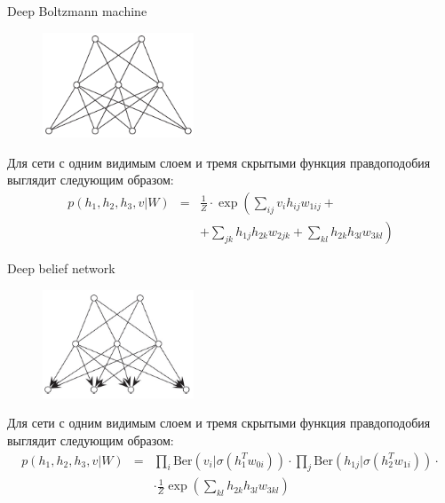 \documentclass[10pt]{beamer}
\begin{document}
\begin{frame}{Deep Boltzmann machine}

\begin{figure}[h!]
  \centering
  \includegraphics[width=0.4\textwidth]{images/dbm.png}
\end{figure}
Для сети с одним видимым слоем и тремя скрытыми функция правдоподобия выглядит следующим образом:
\begin{eqnarray*}
p(h_1, h_2, h_3, v | W) &=& \frac{1}{Z} \cdot \exp\left( \sum_{ij} v_i h_{ij} w_{1ij} + \right. \\
& &\left. + \sum_{jk} h_{1j} h_{2k} w_{2jk} + \sum_{kl} h_{2k} h_{3l} w_{3kl} \right)
\end{eqnarray*}

\end{frame}


\begin{frame}{Deep belief network}

\begin{figure}[h!]
  \centering
  \includegraphics[width=0.4\textwidth]{images/dbn.png}
\end{figure}
Для сети с одним видимым слоем и тремя скрытыми функция правдоподобия выглядит следующим образом:
\begin{eqnarray*}
p(h_1, h_2, h_3, v | W) &=& \prod_i \text{Ber}\left(v_i | \sigma\left(h_1^T w_{0i}\right)\right) \cdot \prod_j \text{Ber}\left(h_{1j} | \sigma\left(h_2^T w_{1i}\right)\right) \cdot \\
& & \cdot \frac{1}{Z} \exp\left( \sum_{kl} h_{2k} h_{3l} w_{3kl} \right)
\end{eqnarray*}

\end{frame}
\end{document}
